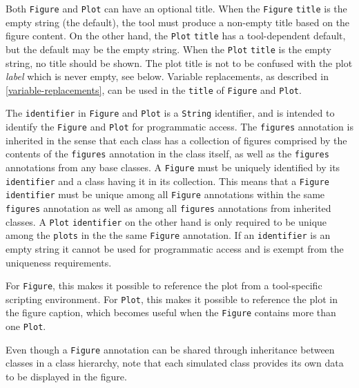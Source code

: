 Both \lstinline!Figure! and \lstinline!Plot! can have an optional title.
When the \lstinline!Figure! \lstinline!title! is the empty string (the default), the tool must produce a non-empty title based on the figure content.
On the other hand, the \lstinline!Plot! \lstinline!title! has a tool-dependent default, but the default may be the empty string.
When the \lstinline!Plot! \lstinline!title! is the empty string, no title should be shown.
The plot title is not to be confused with the plot \emph{label} which is never empty, see below.
Variable replacements, as described in \cref{variable-replacements}, can be used in the \lstinline!title! of \lstinline!Figure! and \lstinline!Plot!.

The \lstinline!identifier! in \lstinline!Figure! and \lstinline!Plot! is a \lstinline!String! identifier, and is intended to identify the \lstinline!Figure! and \lstinline!Plot! for programmatic access.
The \lstinline!figures! annotation is inherited in the sense that each class has a collection of figures comprised by the contents of the \lstinline!figures! annotation in the class itself, as well as the \lstinline!figures! annotations from any base classes.
A \lstinline!Figure! must be uniquely identified by its \lstinline!identifier! and a class having it in its collection.
This means that a \lstinline!Figure! \lstinline!identifier! must be unique among all \lstinline!Figure! annotations within the same \lstinline!figures! annotation as well as among all \lstinline!figures! annotations from inherited classes.
A \lstinline!Plot! \lstinline!identifier! on the other hand is only required to be unique among the \lstinline!plots! in the the same \lstinline!Figure! annotation.
If an \lstinline!identifier! is an empty string it cannot be used for programmatic access and is exempt from the uniqueness requirements.

\begin{nonnormative}
For \lstinline!Figure!, this makes it possible to reference the plot from a tool-specific scripting environment.
For \lstinline!Plot!, this makes it possible to reference the plot in the figure caption, which becomes useful when the \lstinline!Figure! contains more than one \lstinline!Plot!.
\end{nonnormative}

Even though a \lstinline!Figure! annotation can be shared through inheritance between classes in a class hierarchy, note that each simulated class provides its own data to be displayed in the figure.

